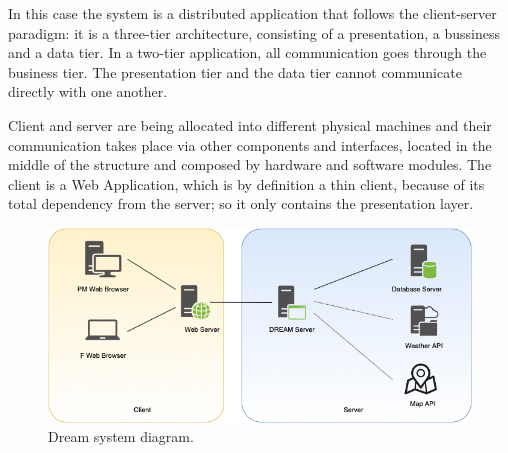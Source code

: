 In this case the system is a distributed application that follows the client-server paradigm: it is a three-tier architecture, consisting of a presentation, a bussiness and a data tier. 
In a two-tier application, all communication goes through the business tier. The presentation tier and the data tier cannot communicate directly with one another. 

Client and server are being allocated into different physical machines and their communication takes place via other components and interfaces, located in the middle of the structure and composed by hardware and software modules. 
The client is a Web Application, which is by definition a thin client, because of its total dependency from the server; so it only contains the presentation layer.

\begin{figure}[H]
    \begin{center}
    \includegraphics[width=1.2\textwidth]{images/System diagram.png}
    \caption{Dream system diagram.}
    \label{fig:system diagram}
    \end{center}
\end{figure}

